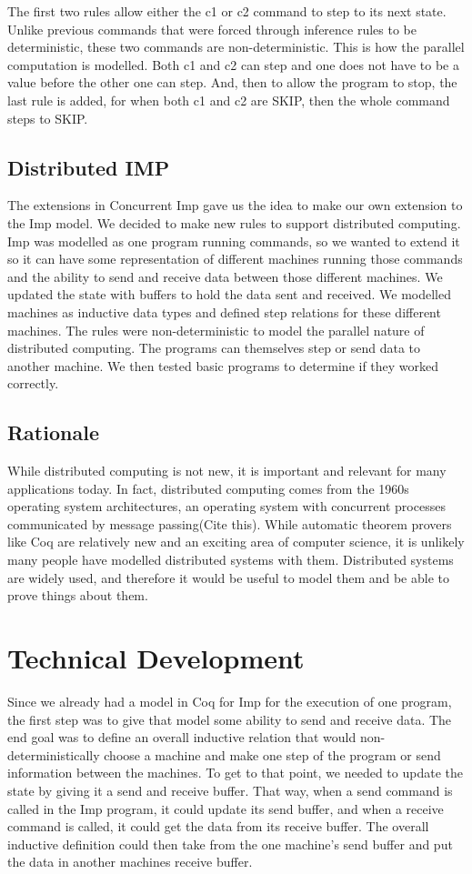 \documentclass{llncs}
\begin{document}
The first two rules allow either the c1 or c2 command to step to its next state. Unlike previous commands that were forced through inference rules to be deterministic, these two commands are non-deterministic. This is how the parallel computation is modelled. Both c1 and c2 can step and one does not have to be a value before the other one can step. And, then to allow the program to stop, the last rule is added, for when both c1 and c2 are SKIP, then the whole command steps to SKIP. 

\subsection{Distributed IMP} 
The extensions in Concurrent Imp gave us the idea to make our own extension to the Imp model. We decided to make new rules to support distributed computing. Imp was modelled as one program running commands, so we wanted to extend it so it can have some representation of different machines running those commands and the ability to send and receive data between those different machines. We updated the state with buffers to hold the data sent and received. We modelled machines as inductive data types and defined step relations for these different machines. The rules were non-deterministic to model the parallel nature of distributed computing. The programs can themselves step or send data to another machine. We then tested basic programs to determine if they worked correctly.

\subsection{Rationale}
While distributed computing is not new, it is important and relevant for many applications today. In fact, distributed computing comes from the 1960s operating system architectures, an operating system with concurrent processes communicated by message passing(Cite this). While automatic theorem provers like Coq are relatively new and an exciting area of computer science, it is unlikely many people have modelled distributed systems with them. Distributed systems are widely used, and therefore it would be useful to model them and be able to prove things about them. 

\section{Technical Development}
Since we already had a model in Coq for Imp for the execution of one program, the first step was to give that model some ability to send and receive data. The end goal was to define an overall inductive relation that would non-deterministically choose a machine and make one step of the program or send information between the machines. To get to that point, we needed to update the state by giving it a send and receive buffer. That way, when a send command is called in the Imp program, it could update its send buffer, and when a receive command is called, it could get the data from its receive buffer. The overall inductive definition could then take from the one machine's send buffer and put the data in another machines receive buffer.
\end{document}
